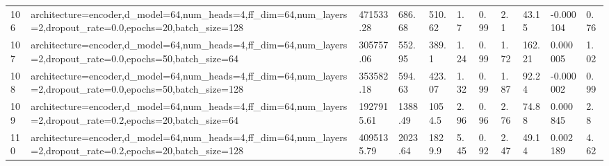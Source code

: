 \begin{longtable}{C{0.8cm} L{2cm} C{1.15cm} C{1.15cm} C{1.15cm} C{1.15cm} C{0.85cm} C{1.25cm} C{1.2cm} C{1.5cm} C{1.0cm}}
106 & architecture=encoder,\newline d\_model=64,\newline num\_heads=4,\newline ff\_dim=64,\newline num\_layers=2,\newline dropout\_rate=0.0,\newline epochs=20,\newline batch\_size=128 & 471533.28 & 686.68 & 510.62 & 1.7 & 0.99 & 2.1 & 43.15 & -0.000104 & 0.76 \\
107 & architecture=encoder,\newline d\_model=64,\newline num\_heads=4,\newline ff\_dim=64,\newline num\_layers=2,\newline dropout\_rate=0.0,\newline epochs=50,\newline batch\_size=64 & 305757.06 & 552.95 & 389.1 & 1.24 & 0.99 & 1.72 & 162.21 & 0.000005 & 1.02 \\
108 & architecture=encoder,\newline d\_model=64,\newline num\_heads=4,\newline ff\_dim=64,\newline num\_layers=2,\newline dropout\_rate=0.0,\newline epochs=50,\newline batch\_size=128 & 353582.18 & 594.63 & 423.07 & 1.32 & 0.99 & 1.87 & 92.24 & -0.000002 & 0.99 \\
109 & architecture=encoder,\newline d\_model=64,\newline num\_heads=4,\newline ff\_dim=64,\newline num\_layers=2,\newline dropout\_rate=0.2,\newline epochs=20,\newline batch\_size=64 & 1927915.61 & 1388.49 & 1054.5 & 2.96 & 0.96 & 2.76 & 74.88 & 0.000845 & 2.8 \\
110 & architecture=encoder,\newline d\_model=64,\newline num\_heads=4,\newline ff\_dim=64,\newline num\_layers=2,\newline dropout\_rate=0.2,\newline epochs=20,\newline batch\_size=128 & 4095135.79 & 2023.64 & 1829.9 & 5.45 & 0.92 & 2.47 & 49.14 & 0.002189 & 4.62 \\

\end{longtable}
